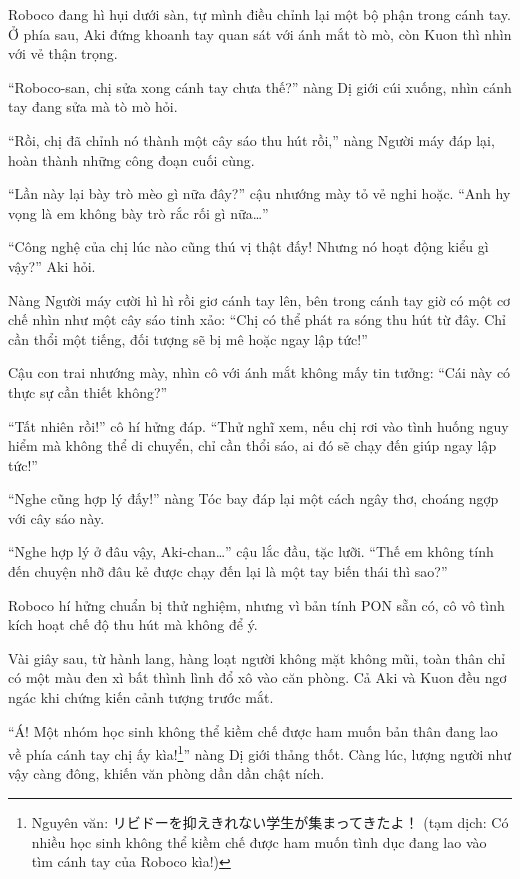 \documentclass[../main.tex]{subfiles}
\begin{document}
Roboco đang hì hụi dưới sàn, tự mình điều chỉnh lại một bộ phận trong cánh tay. Ở phía sau, Aki đứng khoanh tay quan sát với ánh mắt tò mò, còn Kuon thì nhìn với vẻ thận trọng.

``Roboco-san, chị sửa xong cánh tay chưa thế?'' nàng Dị giới cúi xuống, nhìn cánh tay đang sửa mà tò mò hỏi.

``Rồi, chị đã chỉnh nó thành một cây sáo thu hút rồi,'' nàng Người máy đáp lại, hoàn thành những công đoạn cuối cùng.


``Lần này lại bày trò mèo gì nữa đây?'' cậu nhướng mày tỏ vẻ nghi hoặc. ``Anh hy vọng là em không bày trò rắc rối gì nữa\dots''

``Công nghệ của chị lúc nào cũng thú vị thật đấy! Nhưng nó hoạt động kiểu gì vậy?'' Aki hỏi.

Nàng Người máy cười hì hì rồi giơ cánh tay lên, bên trong cánh tay giờ có một cơ chế nhìn như một cây sáo tinh xảo: ``Chị có thể phát ra sóng thu hút từ đây. Chỉ cần thổi một tiếng, đối tượng sẽ bị mê hoặc ngay lập tức!''

Cậu con trai nhướng mày, nhìn cô với ánh mắt không mấy tin tưởng: ``Cái này có thực sự cần thiết không?''

``Tất nhiên rồi!'' cô hí hửng đáp. ``Thử nghĩ xem, nếu chị rơi vào tình huống nguy hiểm mà không thể di chuyển, chỉ cần thổi sáo, ai đó sẽ chạy đến giúp ngay lập tức!''

``Nghe cũng hợp lý đấy!'' nàng Tóc bay đáp lại một cách ngây thơ, choáng ngợp với cây sáo này.

``Nghe hợp lý ở đâu vậy, Aki-chan\dots'' cậu lắc đầu, tặc lưỡi. ``Thế em không tính đến chuyện nhỡ đâu kẻ được chạy đến lại là một tay biến thái thì sao?''

Roboco hí hửng chuẩn bị thử nghiệm, nhưng vì bản tính PON sẵn có, cô vô tình kích hoạt chế độ thu hút mà không để ý.

Vài giây sau, từ hành lang, hàng loạt người không mặt không mũi, toàn thân chỉ có một màu đen xì bất thình lình đổ xô vào căn phòng. Cả Aki và Kuon đều ngơ ngác khi chứng kiến cảnh tượng trước mắt.


``Á! Một nhóm học sinh không thể kiềm chế được ham muốn bản thân đang lao về phía cánh tay chị ấy kìa!\footnote{Nguyên văn: ​リビドーを抑えきれない学生が集まってきたよ！ (tạm dịch: Có nhiều học sinh không thể kiềm chế được ham muốn tình dục đang lao vào tìm cánh tay của Roboco kìa!)}'' nàng Dị giới thảng thốt. Càng lúc, lượng người như vậy càng đông, khiến văn phòng dần dần chật ních.
\end{document}

